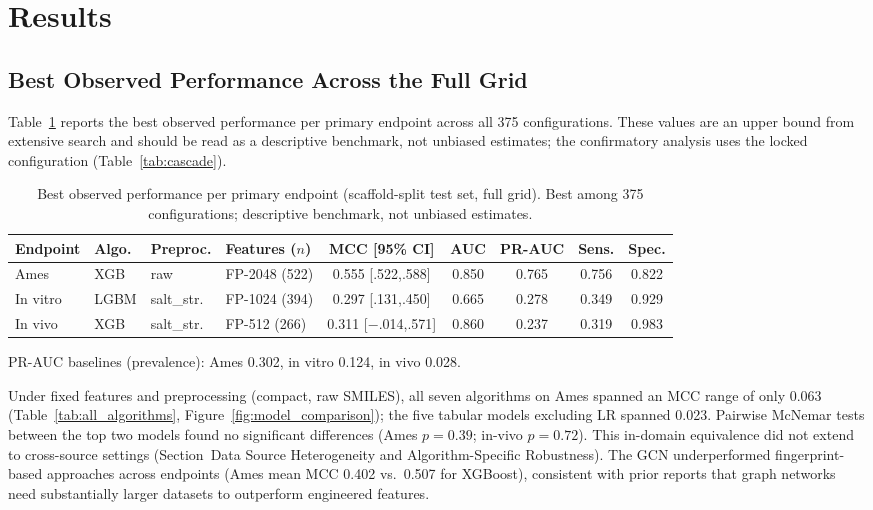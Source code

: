 \section{Results}

\subsection{Best Observed Performance Across the Full Grid}

Table~\ref{tab:best_models} reports the best observed performance per primary endpoint across all 375 configurations.
These values are an upper bound from extensive search and should be read as a descriptive benchmark, not unbiased estimates;
the confirmatory analysis uses the locked configuration (Table~\ref{tab:cascade}).

\begin{table}[ht]
\caption{Best observed performance per primary endpoint (scaffold-split test set, full grid). Best among 375 configurations; descriptive benchmark, not unbiased estimates.}
\label{tab:best_models}
\centering
\small
\begin{tabular}{@{}llllccccc@{}}
\toprule
Endpoint & Algo. & Preproc. & Features ($n$) & MCC [95\% CI] & AUC & PR-AUC & Sens. & Spec. \\
\midrule
Ames & XGB & raw & FP-2048 (522) & 0.555 [.522,.588] & 0.850 & 0.765 & 0.756 & 0.822 \\
In vitro & LGBM & salt\_str. & FP-1024 (394) & 0.297 [.131,.450] & 0.665 & 0.278 & 0.349 & 0.929 \\
In vivo & XGB & salt\_str. & FP-512 (266) & 0.311 [$-$.014,.571] & 0.860 & 0.237 & 0.319 & 0.983 \\
\bottomrule
\end{tabular}

\medskip
\footnotesize
PR-AUC baselines (prevalence): Ames 0.302, in vitro 0.124, in vivo 0.028.
\end{table}

Under fixed features and preprocessing (compact, raw SMILES), all seven algorithms on Ames spanned an MCC range of only 0.063 (Table~\ref{tab:all_algorithms}, Figure~\ref{fig:model_comparison});
the five tabular models excluding LR spanned 0.023. Pairwise McNemar tests\cite{McNemar_1947} between the top two models found no significant differences (Ames $p = 0.39$; in-vivo $p = 0.72$).
This in-domain equivalence did not extend to cross-source settings (Section~Data Source Heterogeneity and Algorithm-Specific Robustness). 
The GCN underperformed fingerprint-based approaches across endpoints (Ames mean MCC 0.402 vs.\ 0.507 for XGBoost),
consistent with prior reports that graph networks need substantially larger datasets to outperform engineered features.

